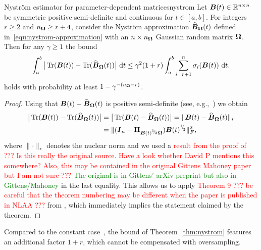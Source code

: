 \begin{theorem}{Nyström estimator for parameter-dependent matrices}{nystrom}
    Let $\boldsymbol{B}(t) \in \mathbb{R}^{n \times n}$ be symmetric positive semi-definite and continuous for $t \in [a, b]$. For integers $r \geq 2$ and $n_{\boldsymbol{\Omega}} \geq r + 4$, consider the Nystr\"om approximation $\widehat{\boldsymbol{B}}_{\boldsymbol{\Omega}}(t)$ defined in~\eqref{equ:nystrom-approximation} with an $n\times n_{\boldsymbol{\Omega}}$ Gaussian random matrix $\boldsymbol{\Omega}$. Then for any $\gamma \geq 1$ the bound 
    \[
        \int_{a}^{b} \big| \operatorname{Tr}(\boldsymbol{B}(t)) - \operatorname{Tr}(\widehat{\boldsymbol{B}}_{\boldsymbol{\Omega}}(t)) \big| ~\mathrm{d}t
        \leq \gamma^2 (1 + r) \int_{a}^{b} \sum_{i = r+1}^{n} \sigma_i(\boldsymbol{B}(t)) ~\mathrm{d}t.
    \]
    holds with probability at least $1 - \gamma^{-(n_{\boldsymbol{\Omega}} - r)}$.
\end{theorem}
\begin{proof}
Using that $\boldsymbol{B}(t) - \widehat{\boldsymbol{B}}_{\boldsymbol{\Omega}}(t)$ is positive semi-definite (see, e.g.,~\cite[Lemma 2.1]{frangella-2023-randomized-nystrom}) we obtain
    \begin{align*}
        \big| \operatorname{Tr}(\boldsymbol{B}(t)) - \operatorname{Tr}(\widehat{\boldsymbol{B}}_{\boldsymbol{\Omega}}(t)) \big|
        & = \big| \operatorname{Tr}(\boldsymbol{B}(t) - \widehat{\boldsymbol{B}}_{\boldsymbol{\Omega}}(t)) \big|
        = \lVert \boldsymbol{B}(t) - \widehat{\boldsymbol{B}}_{\boldsymbol{\Omega}}(t) \rVert _{\ast} \\
        & = \lVert (\boldsymbol{I}_n - \boldsymbol{\Pi}_{\boldsymbol{B}(t)^{{}^{1}{\mskip -5mu/\mskip -3mu}_{2}} \boldsymbol{\Omega}}) \boldsymbol{B}(t)^{{}^{1}{\mskip -5mu/\mskip -3mu}_{2}} \rVert _F^2,
    \end{align*}
    where $\lVert \cdot \rVert _{\ast}$ denotes the nuclear norm and we used a \textcolor{red}{result from the proof of \cite[Corollary 8.2]{tropp-2023-randomized-algorithms} ??? Is this really the original source. Have a look whether David P mentions this somewhere? Also, this may be contained in the original Gittens Mahoney paper but I am not sure ???} \textcolor{green}{The original is in Gittens' arXiv preprint \cite[Theorem 1]{gittens-2011-spectral-norm} but also in Gittens/Mahoney \cite[Equation 4]{gittens-2013-revisiting-nystrom}} in the last equality. This allows us to apply \textcolor{red}{Theorem 9 ??? be careful that the theorem numbering may be different when the paper is published in NLAA ???} from \cite{kressner-2023-randomized-lowrank}, which immediately implies the statement claimed by the theorem.
\end{proof}

Compared to the constant case~\cite[Theorem 8.1]{tropp-2023-randomized-algorithms}, the bound of Theorem~\ref{thm:nystrom} features an additional factor $1+r$, which cannot be compensated with oversampling.


